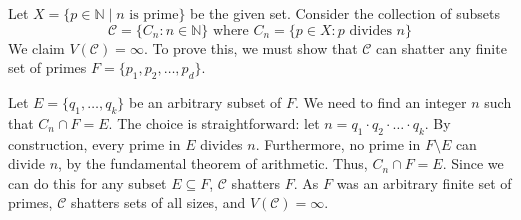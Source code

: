 \begin{example}
    \label{ex:vc-infinite-dimension}
    Let $X = \{p \in \mathbb{N} \mid n \textrm{ is prime}\}$ be the given set. Consider the collection of subsets
    \[
        \mathcal{C} = \{C_n : n \in \mathbb{N}\} \textrm{ where } C_n = \{p \in X : p \text{ divides } n\}
    \]
    We claim $V(\mathcal{C}) = \infty$. To prove this, we must show that $\mathcal{C}$ can shatter any finite set of primes $F = \{p_1, p_2, \dots, p_d\}$.

    Let $E = \{q_1, \dots, q_k\}$ be an arbitrary subset of $F$. We need to find an integer $n$ such that $C_n \cap F = E$. The choice is straightforward: let $n = q_1 \cdot q_2 \cdot \dots \cdot q_k$. By construction, every prime in $E$ divides $n$. Furthermore, no prime in $F \setminus E$ can divide $n$, by the fundamental theorem of arithmetic. Thus, $C_n \cap F = E$. Since we can do this for any subset $E \subseteq F$, $\mathcal{C}$ shatters $F$. As $F$ was an arbitrary finite set of primes, $\mathcal{C}$ shatters sets of all sizes, and $V(\mathcal{C}) = \infty$.
\end{example}